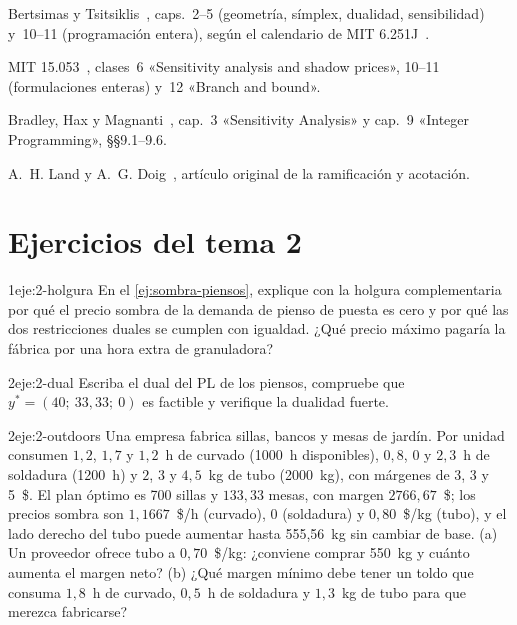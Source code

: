 \begin{lecturas}
\item Bertsimas y Tsitsiklis~\cite{bt}, caps.~2--5 (geometría, símplex, dualidad, sensibilidad) y~10--11 (programación entera), según el calendario de MIT 6.251J~\cite{mit6251}.
\item MIT 15.053~\cite{mit15053}, clases~6 «Sensitivity analysis and shadow prices», 10--11 (formulaciones enteras) y~12 «Branch and bound».
\item Bradley, Hax y Magnanti~\cite{amp}, cap.~3 «Sensitivity Analysis» y cap.~9 «Integer Programming», §§9.1--9.6.
\item A.~H. Land y A.~G. Doig~\cite{landdoig}, artículo original de la ramificación y acotación.
\end{lecturas}

\section*{Ejercicios del tema 2}

\begin{ejercicio}{1}{eje:2-holgura}
En el \cref{ej:sombra-piensos}, explique con la holgura complementaria por qué el precio sombra de la demanda de pienso de puesta es cero y por qué las dos restricciones duales se cumplen con igualdad. ¿Qué precio máximo pagaría la fábrica por una hora extra de granuladora?
\end{ejercicio}

\begin{ejercicio}{2}{eje:2-dual}
Escriba el dual del PL de los piensos, compruebe que $y^{*}=(40;\ 33{,}33;\ 0)$ es factible y verifique la dualidad fuerte.
\end{ejercicio}

\begin{ejercicio}{2}{eje:2-outdoors}
Una empresa fabrica sillas, bancos y mesas de jardín. Por unidad consumen $1{,}2$, $1{,}7$ y $1{,}2$~h de curvado (1000~h disponibles), $0{,}8$, $0$ y $2{,}3$~h de soldadura (1200~h) y $2$, $3$ y $4{,}5$~kg de tubo (2000~kg), con márgenes de 3, 3 y 5~\$. El plan óptimo es 700 sillas y $133{,}33$ mesas, con margen $2766{,}67$~\$; los precios sombra son $1{,}1667$~\$/h (curvado), 0 (soldadura) y $0{,}80$~\$/kg (tubo), y el lado derecho del tubo puede aumentar hasta 555,56~kg sin cambiar de base. (a) Un proveedor ofrece tubo a $0{,}70$~\$/kg: ¿conviene comprar 550~kg y cuánto aumenta el margen neto? (b) ¿Qué margen mínimo debe tener un toldo que consuma $1{,}8$~h de curvado, $0{,}5$~h de soldadura y $1{,}3$~kg de tubo para que merezca fabricarse?
\end{ejercicio}

